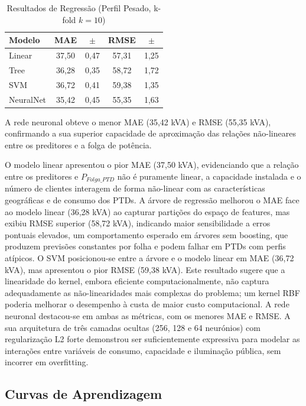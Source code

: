 \documentclass[conference]{IEEEtran}
\begin{document}
\begin{table}[H]
\caption{Resultados de Regressão (Perfil Pesado, k-fold $k=10$)}
\label{tab:regressao}
\begin{center}
\begin{tabular}{lcccc}
\toprule
Modelo & MAE & $\pm$ & RMSE & $\pm$ \\
\midrule
Linear     & 37,50 & 0,47 & 57,31 & 1,25 \\
Tree       & 36,28 & 0,35 & 58,72 & 1,72 \\
SVM        & 36,72 & 0,41 & 59,38 & 1,35 \\
NeuralNet  & 35,42 & 0,45 & 55,35 & 1,63 \\
\bottomrule
\end{tabular}
\end{center}
\end{table}

A rede neuronal obteve o menor MAE (35,42 kVA) e RMSE (55,35 kVA), confirmando a sua superior capacidade de aproximação das relações não-lineares entre os preditores e a folga de potência.

O modelo linear apresentou o pior MAE (37,50 kVA), evidenciando que a relação entre os preditores e $P_{Folga\_PTD}$ não é puramente linear, a capacidade instalada e o número de clientes interagem de forma não-linear com as características geográficas e de consumo dos PTDs. A árvore de regressão melhorou o MAE face ao modelo linear (36,28 kVA) ao capturar partições do espaço de features, mas exibiu RMSE superior (58,72 kVA), indicando maior sensibilidade a erros pontuais elevados, um comportamento esperado em árvores sem boosting, que produzem previsões constantes por folha e podem falhar em PTDs com perfis atípicos. O SVM posicionou-se entre a árvore e o modelo linear em MAE (36,72 kVA), mas apresentou o pior RMSE (59,38 kVA). Este resultado sugere que a linearidade do kernel, embora eficiente computacionalmente, não captura adequadamente as não-linearidades mais complexas do problema; um kernel RBF poderia melhorar o desempenho à custa de maior custo computacional. A rede neuronal destacou-se em ambas as métricas, com os menores MAE e RMSE. A sua arquitetura de três camadas ocultas (256, 128 e 64 neurónios) com regularização L2 forte demonstrou ser suficientemente expressiva para modelar as interações entre variáveis de consumo, capacidade e iluminação pública, sem incorrer em overfitting.

\subsection{Curvas de Aprendizagem}
\end{document}
